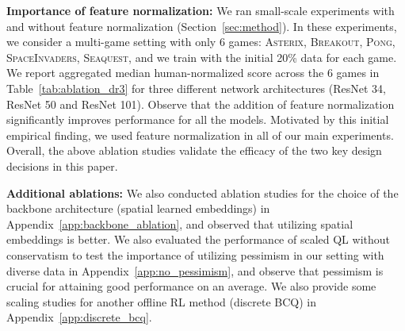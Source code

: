 \textbf{Importance of feature normalization:} We ran small-scale experiments with and without feature normalization (Section~\ref{sec:method}). In these experiments, we consider a multi-game setting with only 6 games: \textsc{Asterix}, \textsc{Breakout}, \textsc{Pong}, \textsc{SpaceInvaders}, \textsc{Seaquest}, and we train with the initial 20\% data for each game. We report aggregated median human-normalized score across the 6 games in Table~\ref{tab:ablation_dr3} for three different network architectures (ResNet 34, ResNet 50 and ResNet 101). Observe that the addition of feature normalization significantly improves performance for all the models. Motivated by this initial empirical finding, we used feature normalization in all of our main experiments. Overall, the above ablation studies validate the efficacy of the two key design decisions in this paper. 

\begin{table}[ht]
    \centering
    \centering
    \vspace{-0.2cm}
    \caption{\footnotesize{\textbf{Performance of Scaled QL with and without feature normalization in the 6 game setting} reported in terms of the median human-normalized score. Observe that with models of all sizes, the addition of feature normalization improves performance.}}
    \label{tab:ablation_dr3}
    \vspace{0.1cm}
\end{table}


\textbf{Additional ablations:} We also conducted ablation studies for the choice of the backbone architecture (spatial learned embeddings) in Appendix~\ref{app:backbone_ablation}, and observed that utilizing spatial embeddings is better. We also evaluated the performance of scaled QL without conservatism to test the importance of utilizing pessimism in our setting with diverse data in Appendix~\ref{app:no_pessimism}, and observe that pessimism is crucial for attaining good performance on an average. We also provide some scaling studies for another offline RL method (discrete BCQ) in Appendix~\ref{app:discrete_bcq}.